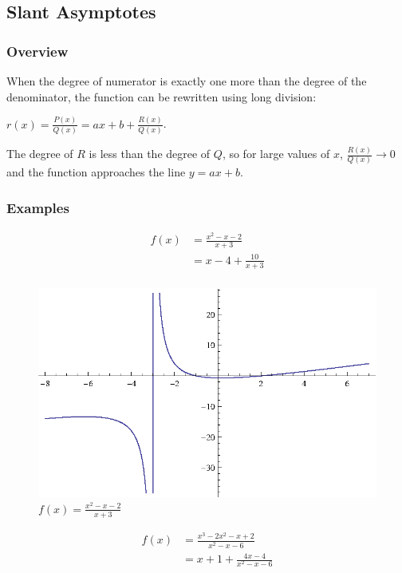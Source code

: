 \documentclass{exam}
\begin{document}
  \subsection{Slant Asymptotes}

  \subsubsection{Overview}

  When the degree of numerator is exactly one more than the degree of the denominator, the function can be rewritten using
  long division:

  $r(x) = \frac{P(x)}{Q(x)} = ax + b + \frac{R(x)}{Q(x)}$.  

  The degree of $R$ is less than the degree of $Q$, so for large values of $x$, $\frac{R(x)}{Q(x)} \rightarrow 0$ and
  the function approaches the line $y = ax + b$.

  \pagebreak

  \subsubsection{Examples}
  \begin{align*}
    f(x) &= \frac{x^2-x-2}{x+3} \\
         &= x - 4 + \frac{10}{x + 3} \\
  \end{align*}

  \begin{figure}[H]
    \centering
    \includegraphics[scale=1.0]{figure6.eps}
    \caption*{$f(x) = \frac{x^2-x-2}{x+3}$}
  \end{figure}

  \begin{align*}
    f(x) &= \frac{x^3-2 x^2-x+2}{x^2-x-6} \\
         &= x + 1 + \frac{4x - 4}{x^2-x-6} \\
  \end{align*}
\end{document}
